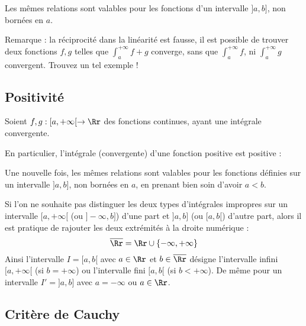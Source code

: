 \documentclass[class=report,crop=false]{standalone}
\begin{document}
\medskip

Les mêmes relations sont valables pour les 
fonctions d'un intervalle $]a,b]$, non bornées en $a$.

Remarque : la réciprocité dans la linéarité est fausse,
il est possible de trouver deux fonctions $f,g$ telles que
$\int_a^{+\infty} f+g$ converge, sans que $\int_a^{+\infty} f$, ni
$\int_a^{+\infty} g$ convergent. Trouvez un tel exemple !

\subsection{Positivité}

\begin{proposition}
Soient $f,g : [a,+\infty[ \to \Rr$ des fonctions continues, ayant une intégrale convergente.
\end{proposition}

En particulier, l'intégrale (convergente) d'une fonction positive est positive :

\medskip

Une nouvelle fois, les mêmes relations sont valables pour les 
fonctions définies sur un intervalle $]a,b]$, non bornées en $a$, 
en prenant bien soin d'avoir $a<b$.

\begin{remarque*}
Si l'on ne souhaite pas distinguer les deux types d'intégrales impropres
sur un intervalle $[a,+\infty[$ (ou $]-\infty,b]$) d'une part
et $]a,b]$ (ou $[a,b[$) d'autre part, alors il est pratique de rajouter les deux extrémités 
à la droite numérique :
\[ \overline{\Rr}=\Rr\cup\{-\infty,+\infty\}  \]
Ainsi l'intervalle $I=[a,b[$ avec $a\in \Rr$ et $b \in \overline{\Rr}$
désigne l'intervalle infini $[a,+\infty[$ (si $b=+\infty$) 
ou l'intervalle fini $[a,b[$ (si $b < +\infty$).
De même pour un intervalle $I'=]a,b]$ avec $a=-\infty$ ou $a \in \Rr$.
\end{remarque*}


\subsection{Critère de Cauchy}
\end{document}
